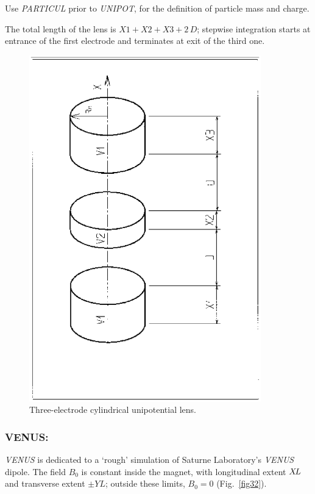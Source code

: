 \noindent Use \textsl{PARTICUL} prior to \textsl{UNIPOT}, for the
 definition of particle mass and charge.

\bigskip

\noindent The total length of the lens is $X1+X2+X3+2\,D$; stepwise integration starts 
at entrance of the first electrode and terminates at exit of the third one. 

\vfill

\begin{figure}[H]
\centerline{\includegraphics[height=15cm,angle=-90]{Fig31.ps}}
\caption{\label{fig31}Three-electrode cylindrical unipotential lens.}
\end{figure}
\vfill

\newpage

\subsubsection*{VENUS: \VENUSTitl}  \label{VENUS}

\textsl{VENUS} is dedicated to a `rough' simulation
of Saturne Laboratory's  \textsl{VENUS} 
dipole.  The field $ B_0 $ is constant inside the magnet, with longitudinal 
extent $ X\!L $ and transverse extent $ \pm YL $;  outside these limits, $ B_0=0$ 
(Fig.~\ref{fig32}).  

